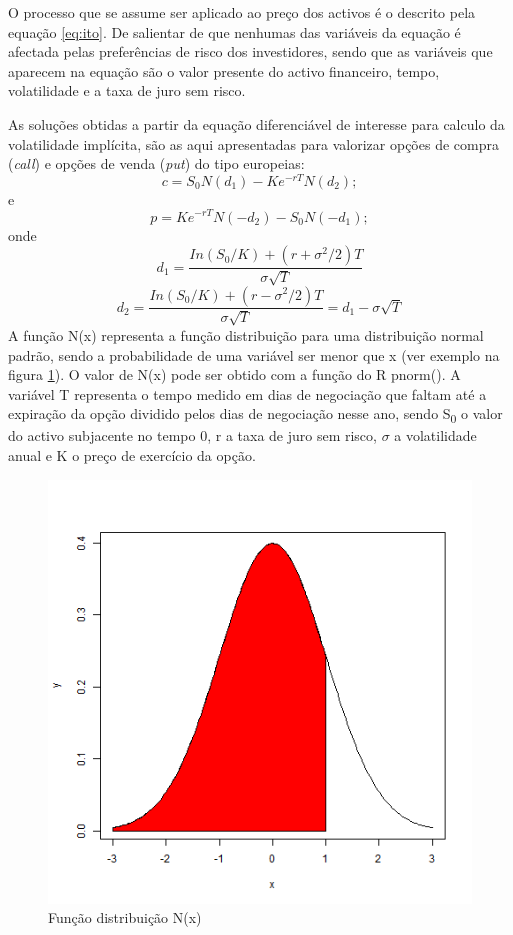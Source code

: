 \documentclass[
  12pt,
  a4paper,
  openany]{book}
\begin{document}
O processo que se assume ser aplicado ao preço dos activos é o descrito pela equação \eqref{eq:ito}. De salientar de que nenhumas das variáveis da equação é afectada pelas preferências de risco dos investidores, sendo que as variáveis que aparecem na equação são o valor presente do activo financeiro, tempo, volatilidade e a taxa de juro sem risco.

As soluções obtidas a partir da equação diferenciável de interesse para calculo da volatilidade implícita, são as aqui apresentadas para valorizar opções de compra (\emph{call}) e opções de venda (\emph{put}) do tipo europeias:
\begin{equation} 
  c = S_0N(d_1) - Ke^{-rT}N(d_2);
  \label{eq:call}
\end{equation}
e
\begin{equation} 
  p = Ke^{-rT}N(-d_2) - S_0N(-d_1);
  \label{eq:put}
\end{equation}
onde
\begin{equation} 
  d_1 = \frac{In(S_0/K)+(r+\sigma^2/2)T}{\sigma\sqrt{T}}
  \label{eq:d1}
\end{equation}
\begin{equation} 
  d_2 = \frac{In(S_0/K)+(r-\sigma^2/2)T}{\sigma\sqrt{T}}=d_1-\sigma\sqrt{T}
  \label{eq:d2}
\end{equation}
A função N(x) representa a função distribuição para uma distribuição normal padrão, sendo a probabilidade de uma variável ser menor que x (ver exemplo na figura \ref{fig:fdistribuicao}). O valor de N(x) pode ser obtido com a função do R pnorm(). A variável T representa o tempo medido em dias de negociação que faltam até a expiração da opção dividido pelos dias de negociação nesse ano, sendo S\textsubscript{0} o valor do activo subjacente no tempo 0, r a taxa de juro sem risco, \(\sigma\) a volatilidade anual e K o preço de exercício da opção.

\begin{figure}

{\centering \includegraphics[width=0.45\linewidth]{image/fdistribuicao} 

}

\caption{Função distribuição N(x)}\label{fig:fdistribuicao}
\end{figure}
\FloatBarrier
\centering
\end{document}
